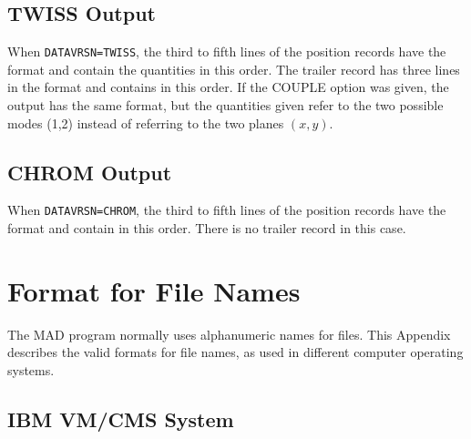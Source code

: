 \section{TWISS Output}
When {\tt DATAVRSN=TWISS},
the third to fifth lines of the position records have the format
and contain the quantities
in this order.
The trailer record has three lines in the format
and contains
in this order.
If the COUPLE option was given, the output has the same format,
but the quantities given refer to the two possible modes (1,2) instead
of referring to the two planes \((x,y)\).
 
\section{CHROM Output}
When {\tt DATAVRSN=CHROM},
the third to fifth lines of the position records have the format
and contain
in this order.
There is no trailer record in this case.
 
\chapter{Format for File Names}
\label{A-FILES}
The MAD program normally uses alphanumeric names for files.
This Appendix describes the valid formats for file names,
as used in different computer operating systems.
\section{IBM VM/CMS System}
\label{S-IBM}
